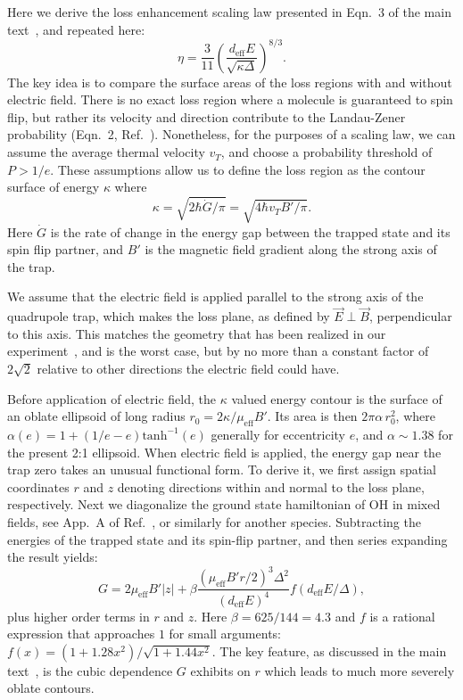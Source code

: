\documentclass[%
 reprint,
 amsmath,amssymb,
 aps,
prl,
]{revtex4-1}
\begin{document}
Here we derive the loss enhancement scaling law presented in Eqn.~3 of the main text~\cite{smt}, and repeated here:
\begin{equation}
\eta=\frac{3}{11} \left(\frac{d_\text{eff}E}{\sqrt{\kappa\Delta}}\right)^{8/3}.
\end{equation}
The key idea is to compare the surface areas of the loss regions with and without electric field.
There is no exact loss region where a molecule is guaranteed to spin flip, but rather its velocity and direction contribute to the Landau-Zener probability (Eqn.~2, Ref.~\cite{smt}).
Nonetheless, for the purposes of a scaling law, we can assume the average thermal velocity $v_T$, and choose a probability threshold of $P>1/e$.
These assumptions allow us to define the loss region as the contour surface of energy $\kappa$ where
\begin{equation}
\kappa=\sqrt{2\hbar\dot{G}/\pi}=\sqrt{4\hbar v_T B'/\pi}.
\end{equation}
Here $\dot{G}$ is the rate of change in the energy gap between the trapped state and its spin flip partner, and $B'$ is the magnetic field gradient along the strong axis of the trap.

We assume that the electric field is applied parallel to the strong axis of the quadrupole trap, which makes the loss plane, as defined by $\vec{E}\perp\vec{B}$, perpendicular to this axis. This matches the geometry that has been realized in our experiment~\cite{Stuhl2013}, and is the worst case, but by no more than a constant factor of $2\sqrt{2}$ relative to other directions the electric field could have.

Before application of electric field, the $\kappa$ valued energy contour is the surface of an oblate ellipsoid of long radius $r_0=2\kappa/\mu_\text{eff}B'$.
Its area is then $2\pi\alpha\,r_0^2$, where $\alpha(e)=1+(1/e-e)\text{tanh}^{-1}(e)$ generally for eccentricity $e$, and $\alpha\sim 1.38$ for the present 2:1 ellipsoid.
When electric field is applied, the energy gap near the trap zero takes an unusual functional form.
To derive it, we first assign spatial coordinates $r$ and $z$ denoting directions within and normal to the loss plane, respectively.
Next we diagonalize the ground state hamiltonian of OH in mixed fields, see App.~A of Ref.~\cite{Stuhl2012uwave}, or similarly for another species.
Subtracting the energies of the trapped state and its spin-flip partner, and then series expanding the result yields:
\begin{equation}
\label{eqn:energy}
G = 2\mu_\text{eff}B'|z| + \beta\frac{(\mu_\text{eff}B'r/2)^3\Delta^2}{(d_\text{eff}E)^4}f(d_\text{eff}E/\Delta),
\end{equation}
plus higher order terms in $r$ and $z$.
Here $\beta=625/144=4.3$ and $f$ is a rational expression that approaches $1$ for small arguments: $f(x) = (1 + 1.28x^2)/\sqrt{1+1.44x^2}$.
The key feature, as discussed in the main text~\cite{smt}, is the cubic dependence $G$ exhibits on $r$ which leads to much more severely oblate contours.
\end{document}
